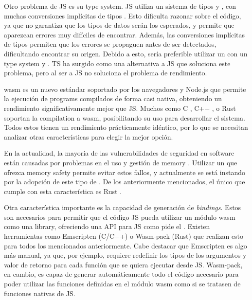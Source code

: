 Otro problema de \gls{JS} es su \gls{type system}. \gls{JS} utiliza un sistema
de tipos  y , con muchas conversiones implícitas de tipos
\parencite{js-type-system}. Esto dificulta razonar sobre el código, ya que no
garantiza que los tipos de datos serán los esperados, y permite que aparezcan
errores muy difíciles de encontrar. Además, las conversiones implícitas de tipos
permiten que los errores se propaguen antes de ser detectados, dificultando
encontrar su origen. Debido a esto, sería preferible utilizar un
 con un \gls{type system}
 y .
\gls{TS} \parencite{typescript} ha surgido como una alternativa a \gls{JS} que
soluciona este problema, pero al ser  a \gls{JS}
no soluciona el problema de rendimiento.

\gls{wasm} \parencite{wasm} es un nuevo estándar soportado por los navegadores y
Node.js que permite la ejecución de \glspl{program} compilados de forma casi
nativa, obteniendo un rendimiento significativamente mejor que \gls{JS}. Muchos
 como C \parencite{C}, C++
\parencite{cpp}, o Rust \parencite{Rust} soportan la \gls{compilation} a
\gls{wasm}, posibilitando su uso para desarrollar el sistema. Todos estos
 tienen un rendimiento prácticamente
idéntico, por lo que se necesitan analizar otras características para elegir la
mejor opción.

En la actualidad, la mayoría de las vulnerabilidades de seguridad en software
están causadas por problemas en el uso y gestión de \gls{memory}
\parencite{microsoft-memory-safety} \parencite{mozilla-memory-safety}. Utilizar
un  que ofrezca \gls{memory safety} permite evitar estos fallos, y
actualmente se está instando por la adopción de este tipo de 
\parencite{CISA-memory-safety} \parencite{whitehouse-memory-safety}. De los
anteriormente mencionados, el único que cumple con esta característica
es Rust \parencite{C-memory-safety}. %

Otra característica importante es la capacidad de generación de
\textit{\glspl{binding}}. Estos son necesarios para permitir que el código
\gls{JS} pueda utilizar un módulo \gls{wasm} como una \gls{library}, ofreciendo
una \gls{API} para \gls{JS} como pide el . Existen herramientas
como Emscripten (C/C++) \parencite{Emscripten} o Wasm-pack (Rust)
\parencite{Wasm-pack} que realizan esto para todos los  mencionados anteriormente. Cabe destacar que Emscripten es
algo más manual, ya que, por ejemplo, requiere redefinir los tipos de los
argumentos y valor de retorno para cada función que se quiera ejecutar desde
\gls{JS}. Wasm-pack, en cambio, es capaz de generar automáticamente todo el
código necesario para poder utilizar las funciones definidas en el módulo
\gls{wasm} como si se tratasen de funciones nativas de \gls{JS}.

